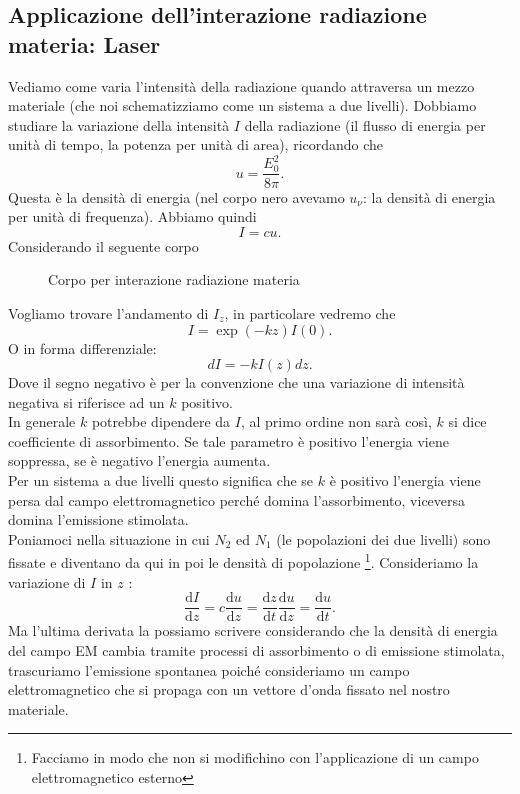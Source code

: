 \subsection{Applicazione dell'interazione radiazione materia: Laser}%
\label{sub:Applicazione dell'interazione radiazione materia: Laser}
Vediamo come varia l'intensità della radiazione quando attraversa un mezzo materiale (che noi schematizziamo come un sistema a due livelli). Dobbiamo studiare la variazione della intensità $I$  della radiazione (il flusso di energia per unità di tempo, la potenza per unità di area), ricordando che
\[
u = \frac{E_0^2}{8\pi}
.\] 
Questa è la densità di energia (nel corpo nero avevamo $u_\nu$: la densità di energia per unità di frequenza). Abbiamo quindi
\[
I=cu
.\] 
Considerando il seguente corpo
\begin{figure}[ht]
    \centering
    \caption{Corpo per interazione radiazione materia}
    \label{fig:corpo-per-interazione-radiazione-materia}
\end{figure}
Vogliamo trovare l'andamento di $I_z$, in particolare vedremo che
\[
    I=\exp\left(-kz\right)I(0) 
.\] 
O in forma differenziale:
\[
    dI = -k I(z)dz
.\] 
Dove il segno negativo è per la convenzione che una variazione di intensità negativa si riferisce ad un $k$  positivo.\\
In generale $k$  potrebbe dipendere da $I$, al primo ordine non sarà così, $k$  si dice coefficiente di assorbimento.
Se tale parametro è positivo l'energia viene soppressa, se è negativo l'energia aumenta.\\
Per un sistema a due livelli questo significa che se $k$  è positivo l'energia viene persa dal campo elettromagnetico perché domina l'assorbimento, viceversa domina l'emissione stimolata.\\
Poniamoci nella situazione in cui $N_2$  ed $N_1$  (le popolazioni dei due livelli) sono fissate e diventano da qui in poi le densità di popolazione \footnote{Facciamo in modo che non si modifichino con l'applicazione di un campo elettromagnetico esterno}.
Consideriamo la variazione di $I$  in $z$  :
\[
\frac{\text{d} I}{\text{d} z} = c \frac{\text{d} u}{\text{d} z} 
= \frac{\text{d} z}{\text{d} t} \frac{\text{d} u}{\text{d} z} = \frac{\text{d} u}{\text{d} t} 
.\]
Ma l'ultima derivata la possiamo scrivere considerando che la densità di energia del campo EM cambia tramite processi di assorbimento o di emissione stimolata, trascuriamo l'emissione spontanea poiché consideriamo un campo elettromagnetico che si propaga con un vettore d'onda fissato nel nostro materiale. \\
